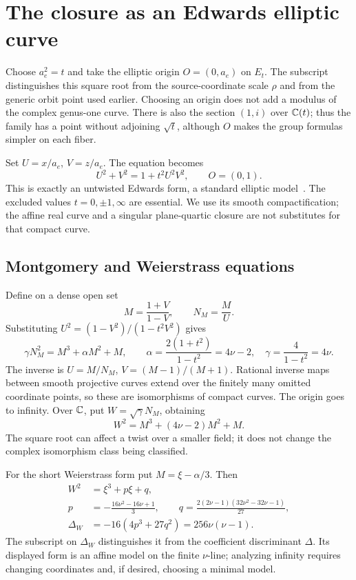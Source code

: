 \section{The closure as an Edwards elliptic curve}\label{sec:edwards}

Choose \(a_e^2=t\) and take the elliptic origin \(O=(0,a_e)\) on \(E_t\). The subscript distinguishes this square root from the source-coordinate scale \(\rho\) and from the generic orbit point used earlier. Choosing an origin does not add a modulus of the complex genus-one curve. There is also the section \((1,i)\) over \(\mathbb C(t)\); thus the family has a point without adjoining \(\sqrt t\), although \(O\) makes the group formulas simpler on each fiber.

Set \(U=x/a_e\), \(V=z/a_e\). The equation becomes
\begin{equation}\label{eq:Edwards}
U^2+V^2=1+t^2U^2V^2,\qquad O=(0,1).
\end{equation}
This is exactly an untwisted Edwards form, a standard elliptic model~\cite{Edwards,Morain,EFD}. The excluded values \(t=0,\pm1,\infty\) are essential. We use its smooth compactification; the affine real curve and a singular plane-quartic closure are not substitutes for that compact curve.

\subsection{Montgomery and Weierstrass equations}
Define on a dense open set
\[
M=\frac{1+V}{1-V},\qquad N_M=\frac{M}{U}.
\]
Substituting \(U^2=(1-V^2)/(1-t^2V^2)\) gives
\begin{equation}\label{eq:Montgomery}
\gamma N_M^2=M^3+\alpha M^2+M,
\qquad \alpha=\frac{2(1+t^2)}{1-t^2}=4\nu-2,
\quad\gamma=\frac4{1-t^2}=4\nu.
\end{equation}
The inverse is \(U=M/N_M\), \(V=(M-1)/(M+1)\). Rational inverse maps between smooth projective curves extend over the finitely many omitted coordinate points, so these are isomorphisms of compact curves. The origin goes to infinity. Over \(\mathbb C\), put \(W=\sqrt\gamma N_M\), obtaining
\begin{equation}\label{eq:Weierstrass}
W^2=M^3+(4\nu-2)M^2+M.
\end{equation}
The square root can affect a twist over a smaller field; it does not change the complex isomorphism class being classified.

For the short Weierstrass form put \(M=\xi-\alpha/3\). Then
\begin{align}
W^2&=\xi^3+p\xi+q,\nonumber\\
p&=-\frac{16\nu^2-16\nu+1}{3},\qquad
q=\frac{2(2\nu-1)(32\nu^2-32\nu-1)}{27},\label{eq:short}\\
\Delta_W&=-16(4p^3+27q^2)=256\nu(\nu-1).\label{eq:Wdisc}
\end{align}
The subscript on \(\Delta_W\) distinguishes it from the coefficient discriminant \(\Delta\). Its displayed form is an affine model on the finite \(\nu\)-line; analyzing infinity requires changing coordinates and, if desired, choosing a minimal model.

